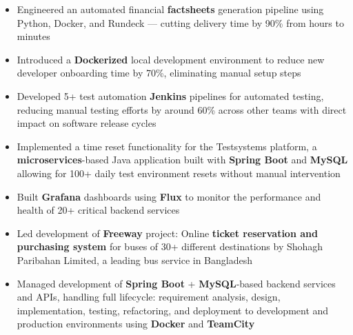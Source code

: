 \documentclass[10pt,a4paper,ragged2e,withhyper]{altacv}
\renewcommand{\divider}{\textcolor{PastelRed!50}{\hdashrule{1.015\linewidth}{0.6pt}{0.6ex}}\medskip}
\begin{document}
\begin{paracol}{2}
\begin{itemize}
\item \justifying Engineered an automated financial \textbf{factsheets} generation pipeline using Python, Docker, and Rundeck — cutting delivery time by 90\% from hours to minutes
\item \justifying Introduced a \textbf{Dockerized} local development environment to reduce new developer onboarding time by 70\%, eliminating manual setup steps
\item \justifying Developed 5+ test automation \textbf{Jenkins} pipelines for automated testing, reducing manual testing efforts by around 60\% across other teams with direct impact on software release cycles
\item \justifying Implemented a time reset functionality for the Testsystems platform, a \textbf{microservices}-based Java application built with \textbf{Spring Boot} and \textbf{MySQL} allowing for 100+ daily test environment resets without manual intervention
\item \justifying Built \textbf{Grafana} dashboards using \textbf{Flux} to monitor the performance and health of 20+ critical backend services
\end{itemize}

\divider

\begin{itemize}
\item \justifying Led development of \textbf{Freeway} project: Online \textbf{ticket reservation and purchasing system} for buses of 30+ different destinations by Shohagh Paribahan Limited, a leading bus service in Bangladesh
\item \justifying Managed development of \textbf{Spring Boot} + \textbf{MySQL}-based backend services and APIs, handling full lifecycle: requirement analysis, design, implementation, testing, refactoring, and deployment to development and production environments using \textbf{Docker} and \textbf{TeamCity}
\end{itemize}

\divider


\end{paracol}
\end{document}
